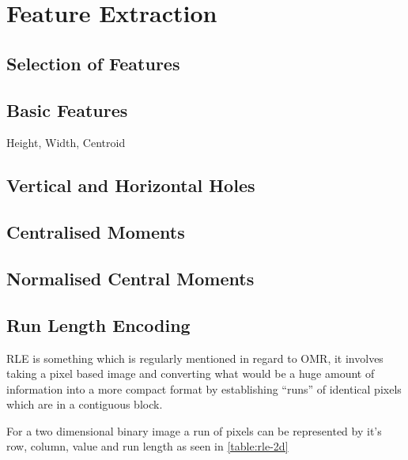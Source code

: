 \section{Feature Extraction}

\subsection{Selection of Features}

\subsection{Basic Features}
Height, Width, Centroid

\subsection{Vertical and Horizontal Holes}

\subsection{Centralised Moments}

\subsection{Normalised Central Moments}

\subsection{Run Length Encoding}
\label{sec:tb-rle}

\acrfull{RLE} is something which is regularly mentioned in regard to OMR, it involves taking a pixel based image and converting what would be a huge amount of information into a more compact format by establishing ``runs'' of identical pixels which are in a contiguous block.

For a two dimensional binary image a run of pixels can be represented by it's row, column, value and run length \parencite[p. 27-28]{burger2009principles} as seen in \cref{table:rle-2d}

